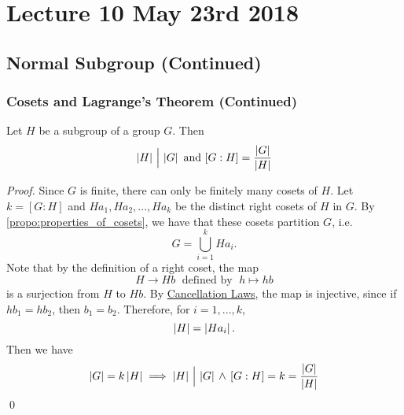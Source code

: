 \chapter{Lecture 10 May 23rd 2018}%
\label{chp:lecture_10_may_23rd_2018}

\section{Normal Subgroup (Continued)}%
\label{sec:normal_subgroup_continued}

\subsection{Cosets and Lagrange's Theorem (Continued)}%
\label{sub:cosets_and_lagrange_s_theorem_continued}

\begin{thm}
\label{thm:lagrange_s_theorem}
  Let $H$ be a subgroup of a  group $G$. Then
  \begin{equation*}
    \left|H\right| \, \Big| \, \left|G\right| \text{ and } [G : H] = \frac{\left|G\right|}{\left|H\right|}
  \end{equation*}
\end{thm}

\begin{proof}
  Since $G$ is finite, there can only be finitely many cosets of $H$. Let $k = [G : H]$ and $Ha_1, Ha_2, ..., Ha_k$ be the distinct right cosets of $H$ in $G$. By \cref{propo:properties_of_cosets}, we have that these cosets partition $G$, i.e.
  \begin{equation*}
    G = \bigcup_{i = 1}^{k} Ha_i.
  \end{equation*}
  Note that by the definition of a right coset, the map 
  \begin{equation*}
    H \to Hb \; \text{ defined by } \; h \mapsto hb
  \end{equation*}
  is a surjection from $H$ to $Hb$. By \hyperref[propo:cancellation_laws]{Cancellation Laws}, the map is injective, since if $hb_1 = hb_2$, then $b_1 = b_2$. Therefore, for $i = 1, ..., k$,
  \begin{equation*}
    \left|H\right| = \left|Ha_i\right|.
  \end{equation*}
  Then we have
  \begin{equation*}
    \left|G\right| = k \left|H\right| \implies \left|H\right| \, \Big| \, \left|G\right| \, \land \, [G : H] = k = \frac{\left|G\right|}{\left|H\right|}
  \end{equation*}\qed
\end{proof}

